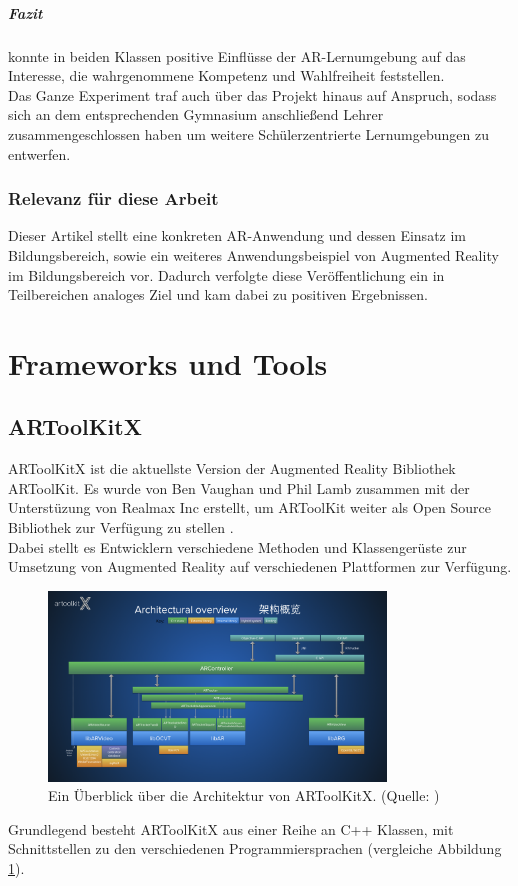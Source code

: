 \subparagraph{Fazit}
\citeauthor{buchner:ar-geschichtsunterricht} konnte in beiden Klassen positive Einflüsse der AR-Lernumgebung auf das Interesse, die wahrgenommene Kompetenz und Wahlfreiheit feststellen.\\
Das Ganze Experiment traf auch über das Projekt hinaus auf Anspruch, sodass sich an dem entsprechenden Gymnasium anschließend Lehrer zusammengeschlossen haben um weitere Schülerzentrierte Lernumgebungen zu entwerfen. \citep[Kapitel 5-6]{buchner:ar-geschichtsunterricht}

\subsubsection{Relevanz für diese Arbeit}
Dieser Artikel stellt eine konkreten AR-Anwendung und dessen Einsatz im Bildungsbereich, sowie ein weiteres Anwendungsbeispiel von Augmented Reality im Bildungsbereich vor. Dadurch verfolgte diese Veröffentlichung ein in Teilbereichen analoges Ziel und kam dabei zu positiven Ergebnissen.

\section{Frameworks und Tools}

\subsection{ARToolKitX}
ARToolKitX ist die aktuellste Version der Augmented Reality Bibliothek ARToolKit. Es wurde von Ben Vaughan und Phil Lamb zusammen mit der Unterstüzung von Realmax Inc erstellt, um ARToolKit weiter als Open Source Bibliothek zur Verfügung zu stellen \citep{artoolkitx:startseite}. \\
Dabei stellt es Entwicklern verschiedene Methoden und Klassengerüste zur Umsetzung von Augmented Reality auf verschiedenen Plattformen zur Verfügung.\\
\begin{figure}
\centering
\includegraphics[width=0.8\textwidth]{Abbildungen/artoolkitx-architecture.png}
\caption[ARToolKitX Architektur]{Ein Überblick über die Architektur von ARToolKitX. (Quelle: \cite{artoolkitx:architecture})}
\label{fig:artoolkitx-architecture}
\end{figure}
Grundlegend besteht ARToolKitX aus einer Reihe an C++ Klassen, mit Schnittstellen zu den verschiedenen Programmiersprachen (vergleiche Abbildung \ref{fig:artoolkitx-architecture}).

